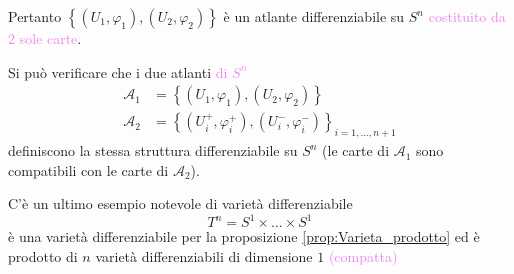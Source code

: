 \begin{esempio}
        Pertanto $\left\{ (U_1, \varphi_1), (U_2, \varphi_2) \right\}$ è un atlante differenziabile su $S^n$ \textcolor{violet}{costituito da $2$ sole carte}.
        \end{esempio}

        \begin{osservazione}
        \mbox{}

        Si può verificare che i due atlanti \textcolor{violet}{di $S^n$}
        \begin{align*}
        \mathcal{A}_1 &= \left\{ (U_1, \varphi_1), (U_2, \varphi_2) \right\} \\
        \mathcal{A}_2 &= \left\{ (U_i^+, \varphi_i^+), (U_i^-, \varphi_i^-) \right\}_{i=1, \dots, n+1}
        \end{align*}
        definiscono la stessa struttura differenziabile su $S^n$ (le carte di $\mathcal{A}_1$ sono compatibili con le carte di $\mathcal{A}_2$).
        \end{osservazione}
        \begin{esempio}[Toro]
        \mbox{}

        C'è un ultimo esempio notevole di varietà differenziabile 
        \[ T^n = S^1 \times \ldots \times S^1 \]
        è una varietà differenziabile per la proposizione \ref{prop:Varieta_prodotto} ed è prodotto di $n$ varietà differenziabili di dimensione $1$ 
        \textcolor{violet}{(compatta)}
        \end{esempio}
        \newpage
